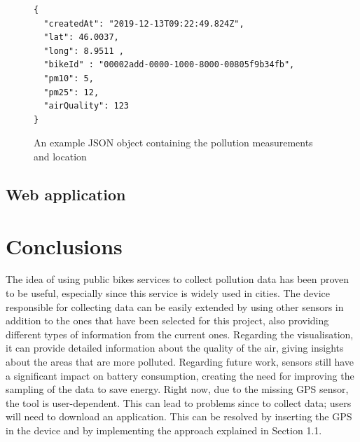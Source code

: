 \documentclass[12pt]{article}
\begin{document}

  \begin{figure}[h]
    \centering
    \begin{verbatim}
{
  "createdAt": "2019-12-13T09:22:49.824Z",
  "lat": 46.0037,
  "long": 8.9511 ,
  "bikeId" : "00002add-0000-1000-8000-00805f9b34fb",
  "pm10": 5,
  "pm25": 12,
  "airQuality": 123
}
    \end{verbatim}
  \caption{An example JSON object containing the pollution measurements and location}\label{lst:json-packet}
  \end{figure}

  \subsection{Web application}
  \newpage
  \section{Conclusions}
  The idea of using public bikes services to collect pollution data has been proven to be useful, especially since this service is widely used in cities. The device responsible for collecting data can be easily extended by using other sensors in addition to the ones that have been selected for this project, also providing different types of information from the current ones. Regarding the visualisation, it can provide detailed information about the quality of the air, giving insights about the areas that are more polluted. Regarding future work, sensors still have a significant impact on battery consumption, creating the need for improving the sampling of the data to save energy.  Right now, due to the missing GPS sensor, the tool is user-dependent. This can lead to problems since to collect data; users will need to download an application. This can be resolved by inserting the GPS in the device and by implementing the approach explained in Section 1.1.   
\end{document}
